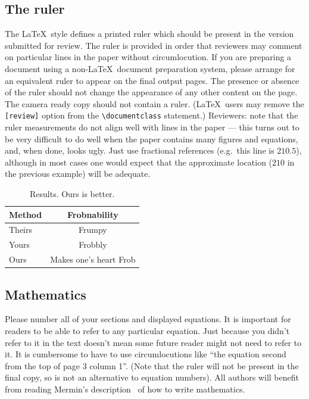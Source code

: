 \documentclass{bmvc2k}
\begin{document}
\subsection{The ruler}
The \LaTeX\ style defines a printed ruler which should be present in the
version submitted for review.  The ruler is provided in order that
reviewers may comment on particular lines in the paper without
circumlocution.  If you are preparing a document using a non-\LaTeX\
document preparation system, please arrange for an equivalent ruler to
appear on the final output pages.  The presence or absence of the ruler
should not change the appearance of any other content on the page.  The
camera ready copy should not contain a ruler. (\LaTeX\ users may remove
the \verb'[review]' option from the \verb'\documentclass' statement.)
Reviewers: note that the ruler measurements do not align well with lines
in the paper --- this turns out to be very difficult to do well when the
paper contains many figures and equations, and, when done, looks ugly.
Just use fractional references (e.g.\ this line is $210.5$), although in
most cases one would expect that the approximate location ($210$ in the
previous example) will be adequate.


\begin{table}
\begin{center}
\begin{tabular}{|l|c|}
\hline
Method & Frobnability \\
\hline\hline
Theirs & Frumpy \\
Yours & Frobbly \\
Ours & Makes one's heart Frob\\
\hline
\end{tabular}
\end{center}
\caption{Results.   Ours is better.}
\end{table}

\subsection{Mathematics}

Please number all of your sections and displayed equations.  It is
important for readers to be able to refer to any particular equation.  Just
because you didn't refer to it in the text doesn't mean some future reader
might not need to refer to it.  It is cumbersome to have to use
circumlocutions like ``the equation second from the top of page 3 column
1''.  (Note that the ruler will not be present in the final copy, so is not
an alternative to equation numbers).  All authors will benefit from reading
Mermin's description~\cite{Mermin89} of how to write mathematics.
\end{document}
